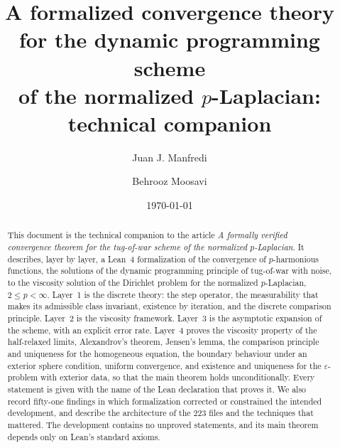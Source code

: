 \documentclass[11pt,reqno]{amsart}
\newcommand{\eps}{\varepsilon}
\theoremstyle{plain}
\theoremstyle{definition}
\begin{document}
\title[Formalized convergence for the normalized $p$-Laplacian:
       technical companion]
      {A formalized convergence theory\\
       for the dynamic programming scheme\\
       of the normalized $p$-Laplacian:\\
       technical companion}

\author{Juan J. Manfredi}
\address{Department of Mathematics, University of Pittsburgh,
  Pittsburgh, PA 15260, USA}

\author{Behrooz Moosavi}
\address{Department of Mathematics, University of Pittsburgh,
  Pittsburgh, PA 15260, USA}

\date{\today}


\begin{abstract}
This document is the technical companion to the article \emph{A formally
verified convergence theorem for the tug-of-war scheme of the normalized
$p$-Laplacian}. It describes, layer by layer, a Lean~4 formalization of the
convergence of $p$-harmonious functions, the solutions of the dynamic
programming principle of tug-of-war with noise, to the viscosity solution of
the Dirichlet problem for the normalized $p$-Laplacian, $2 \le p < \infty$.
Layer~1 is the discrete theory: the step operator, the measurability that makes
its admissible class invariant, existence by iteration, and the discrete
comparison principle. Layer~2 is the viscosity framework. Layer~3 is the
asymptotic expansion of the scheme, with an explicit error rate. Layer~4 proves
the viscosity property of the half-relaxed limits, Alexandrov's theorem,
Jensen's lemma, the comparison principle and uniqueness for the homogeneous
equation, the
boundary behaviour under an exterior sphere condition, uniform convergence, and
existence and uniqueness for the $\eps$-problem with exterior data, so that the
main theorem holds unconditionally.
Every statement is given with the name of the Lean declaration that proves it.
We also record fifty-one findings in which formalization corrected or
constrained the intended development, and describe the architecture of the 223
files and
the techniques that mattered. The development contains no unproved statements,
and its main theorem depends only on Lean's standard axioms.
\end{abstract}
\end{document}
